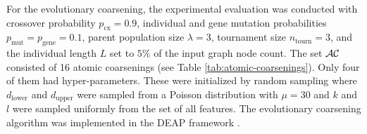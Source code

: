For the evolutionary coarsening, the experimental evaluation was conducted with crossover probability \( p_\mathrm{cx} = 0.9 \), individual and gene mutation probabilities \( p_\mathrm{mut} = p_\mathrm{gene} = 0.1 \), parent population size \( \lambda = 3 \), tournament size \( n_\mathrm{tourn} = 3 \), and the individual length \( L \) set to \( 5\% \) of the input graph node count. The set \( \mathcal{AC} \) consisted of 16 atomic coarsenings (see Table \ref{tab:atomic-coarsenings}). Only four of them had hyper-parameters. These were initialized by random sampling where \( d_\mathrm{lower} \) and \( d_\mathrm{upper} \) were sampled from a Poisson distribution with \( \mu = 30 \) and \( k \) and \( l \) were sampled uniformly from the set of all features. The evolutionary coarsening algorithm was implemented in the DEAP framework \cite{fortin_deap_2012}.

